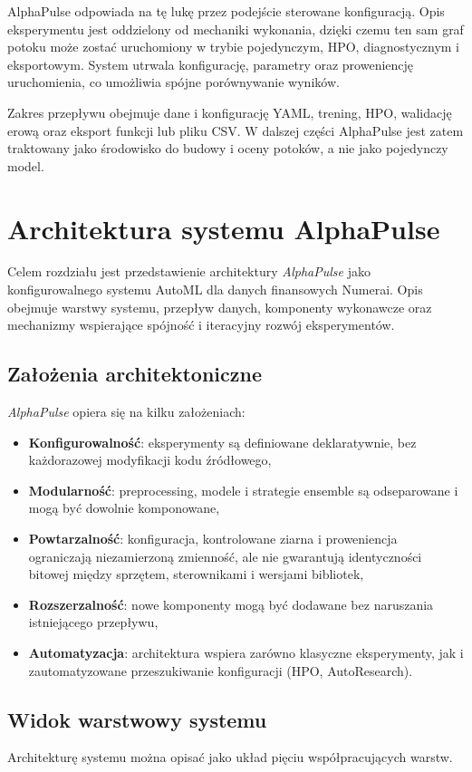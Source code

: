 \documentclass[12pt,a4paper]{report}
\begin{document}
AlphaPulse odpowiada na tę lukę przez podejście sterowane konfiguracją. Opis
eksperymentu jest oddzielony od mechaniki wykonania, dzięki czemu ten sam graf
potoku może zostać uruchomiony w trybie pojedynczym, HPO, diagnostycznym i
eksportowym. System utrwala konfigurację, parametry oraz proweniencję uruchomienia,
co umożliwia spójne porównywanie wyników.

Zakres przepływu obejmuje dane i konfigurację YAML, trening, HPO, walidację erową
oraz eksport funkcji  lub pliku CSV. W dalszej części AlphaPulse
jest zatem traktowany jako środowisko do budowy i oceny potoków, a nie jako
pojedynczy model.

\chapter{Architektura systemu AlphaPulse}

Celem rozdziału jest przedstawienie architektury \textit{AlphaPulse} jako
konfigurowalnego systemu AutoML dla danych finansowych Numerai. Opis obejmuje
warstwy systemu, przepływ danych, komponenty wykonawcze oraz mechanizmy wspierające
spójność i iteracyjny rozwój eksperymentów.

\section{Założenia architektoniczne}
\textit{AlphaPulse} opiera się na kilku założeniach:
\begin{itemize}\item \textbf{Konfigurowalność}: eksperymenty są definiowane deklaratywnie, bez
    każdorazowej modyfikacji kodu źródłowego,
\item \textbf{Modularność}: preprocessing, modele i strategie ensemble są odseparowane
    i mogą być dowolnie komponowane,
\item \textbf{Powtarzalność}: konfiguracja, kontrolowane ziarna i proweniencja
    ograniczają niezamierzoną zmienność, ale nie gwarantują identyczności bitowej między
    sprzętem, sterownikami i wersjami bibliotek,
\item \textbf{Rozszerzalność}: nowe komponenty mogą być dodawane bez naruszania
    istniejącego przepływu,
\item \textbf{Automatyzacja}: architektura wspiera zarówno klasyczne eksperymenty,
    jak i zautomatyzowane przeszukiwanie konfiguracji (HPO, AutoResearch).\end{itemize}

\section{Widok warstwowy systemu}
Architekturę systemu można opisać jako układ pięciu współpracujących warstw.
\end{document}

